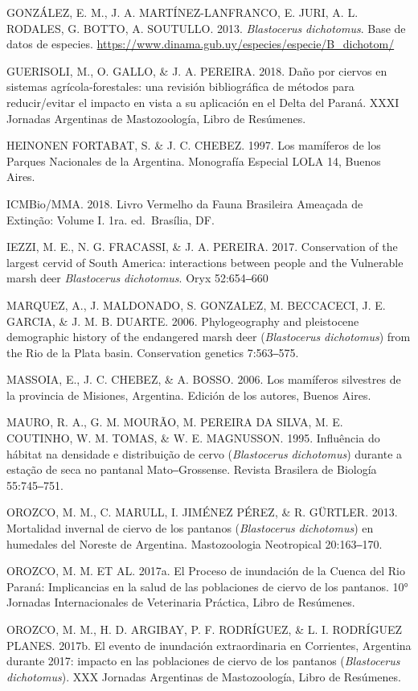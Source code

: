\documentclass[
  x11names]{article}
\begin{document}
GONZÁLEZ, E. M., J. A. MARTÍNEZ-LANFRANCO, E. JURI, A. L. RODALES, G.
BOTTO, A. SOUTULLO. 2013. \textit{Blastocerus} \textit{dichotomus}. Base
de datos de especies.
\url{https://www.dinama.gub.uy/especies/especie/B_dichotom/}

GUERISOLI, M., O. GALLO, \& J. A. PEREIRA. 2018. Daño por ciervos en
sistemas agrícola-forestales: una revisión bibliográfica de métodos para
reducir/evitar el impacto en vista a su aplicación en el Delta del
Paraná. XXXI Jornadas Argentinas de Mastozoología, Libro de Resúmenes.

HEINONEN FORTABAT, S. \& J. C. CHEBEZ. 1997. Los mamíferos de los
Parques Nacionales de la Argentina. Monografía Especial LOLA 14, Buenos
Aires.

ICMBio/MMA. 2018. Livro Vermelho da Fauna Brasileira Ameaçada de
Extinção: Volume I. 1ra. ed.~Brasília, DF.

IEZZI, M. E., N. G. FRACASSI, \& J. A. PEREIRA. 2017. Conservation of
the largest cervid of South America: interactions between people and the
Vulnerable marsh deer \textit{Blastocerus} \textit{dichotomus}. Oryx
52:654‒660

MARQUEZ, A., J. MALDONADO, S. GONZALEZ, M. BECCACECI, J. E. GARCIA, \&
J. M. B. DUARTE. 2006. Phylogeography and pleistocene demographic
history of the endangered marsh deer (\textit{Blastocerus}
\textit{dichotomus}) from the Rio de la Plata basin. Conservation
genetics 7:563‒575.

MASSOIA, E., J. C. CHEBEZ, \& A. BOSSO. 2006. Los mamíferos silvestres
de la provincia de Misiones, Argentina. Edición de los autores, Buenos
Aires.

MAURO, R. A., G. M. MOURÃO, M. PEREIRA DA SILVA, M. E. COUTINHO, W. M.
TOMAS, \& W. E. MAGNUSSON. 1995. Influência do hábitat na densidade e
distribuição de cervo (\textit{Blastocerus} \textit{dichotomus}) durante
a estação de seca no pantanal Mato‒Grossense. Revista Brasilera de
Biología 55:745‒751.

OROZCO, M. M., C. MARULL, I. JIMÉNEZ PÉREZ, \& R. GÜRTLER. 2013.
Mortalidad invernal de ciervo de los pantanos (\textit{Blastocerus}
\textit{dichotomus}) en humedales del Noreste de Argentina.
Mastozoologia Neotropical 20:163‒170.

OROZCO, M. M. ET AL. 2017a. El Proceso de inundación de la Cuenca del
Rio Paraná: Implicancias en la salud de las poblaciones de ciervo de los
pantanos. 10° Jornadas Internacionales de Veterinaria Práctica, Libro de
Resúmenes.

OROZCO, M. M., H. D. ARGIBAY, P. F. RODRÍGUEZ, \& L. I. RODRÍGUEZ
PLANES. 2017b. El evento de inundación extraordinaria en Corrientes,
Argentina durante 2017: impacto en las poblaciones de ciervo de los
pantanos (\textit{Blastocerus} \textit{dichotomus}). XXX Jornadas
Argentinas de Mastozoología, Libro de Resúmenes.
\end{document}

